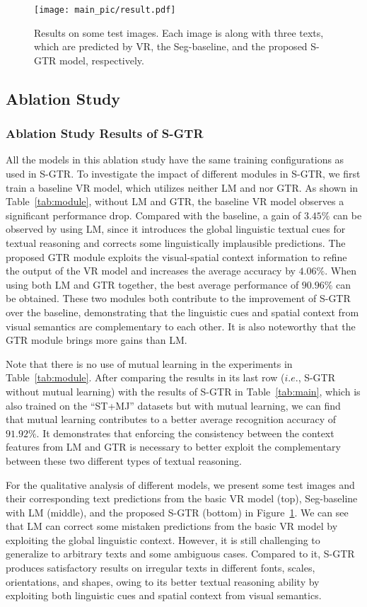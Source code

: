\documentclass[letterpaper]{article} \usepackage{aaai22}  \usepackage{times}  \usepackage{helvet}  \usepackage{courier}  \usepackage[hyphens]{url}  \usepackage{graphicx} \urlstyle{rm} \def\UrlFont{\rm}  \usepackage{natbib}  \usepackage{caption} \DeclareCaptionStyle{ruled}{labelfont=normalfont,labelsep=colon,strut=off} \frenchspacing  \setlength{\pdfpagewidth}{8.5in}  \setlength{\pdfpageheight}{11in}
\begin{document}
\begin{figure}
	\centering
    \texttt{[image: main\_pic/result.pdf]}
	\caption{Results on some test images. Each image is along with three texts, which are predicted by VR, the Seg-baseline, and the proposed S-GTR model, respectively.}
	\label{main-pic}
\end{figure}
\subsection{Ablation Study}
\subsubsection{Ablation Study Results of S-GTR}
All the models in this ablation study have the same training configurations as used in S-GTR. To investigate the impact of different modules in S-GTR, we first train a baseline VR model, which utilizes neither LM and nor GTR. As shown in Table~\ref{tab:module}, without LM and GTR, the baseline VR model observes a significant performance drop. Compared with the baseline, a gain of $3.45\%$ can be observed by using LM, since it introduces the global linguistic textual cues for textual reasoning and corrects some linguistically implausible predictions. The proposed GTR module exploits the visual-spatial context information to refine the output of the VR model and increases the average accuracy by $4.06\%$. When using both LM and GTR together, the best average performance of $90.96\%$ can be obtained. These two modules both contribute to the improvement of S-GTR over the baseline, demonstrating that the linguistic cues and spatial context from visual semantics are complementary to each other. It is also noteworthy that the GTR module brings more gains than LM. 

Note that there is no use of mutual learning in the experiments in Table~\ref{tab:module}. After comparing the results in its last row ($i.e.$, S-GTR without mutual learning) with the results of S-GTR in Table~\ref{tab:main}, which is also trained on the ``ST+MJ'' datasets but with mutual learning, we can find that mutual learning contributes to a better average recognition accuracy of $91.92\%$. It demonstrates that enforcing the consistency between the context features from LM and GTR is necessary to better exploit the complementary between these two different types of textual reasoning.



For the qualitative analysis of different models, we present some test images and their corresponding text predictions from the basic VR model (top), Seg-baseline with LM (middle), and the proposed S-GTR (bottom) in Figure~\ref{main-pic}. We can see that LM can correct some mistaken predictions from the basic VR model by exploiting the global linguistic context. However, it is still challenging to generalize to arbitrary texts and some ambiguous cases. Compared to it, S-GTR produces satisfactory results on irregular texts in different fonts, scales, orientations, and shapes, owing to its better textual reasoning ability by exploiting both linguistic cues and spatial context from visual semantics.
\end{document}
